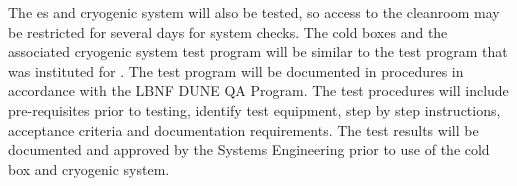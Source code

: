 The \coldbox{}es and cryogenic system will also be tested, so access to the cleanroom  may be restricted for several days for system checks. 
The cold boxes and the associated cryogenic system test program will be similar to the test program that was instituted for . 
The test program will be documented in procedures in accordance with the LBNF DUNE QA Program. The test procedures will include pre-requisites prior to testing, identify test equipment, step by step instructions, acceptance criteria and documentation requirements. The test results will be documented and approved by the Systems Engineering prior to use of the cold box and cryogenic system.


\clearpage